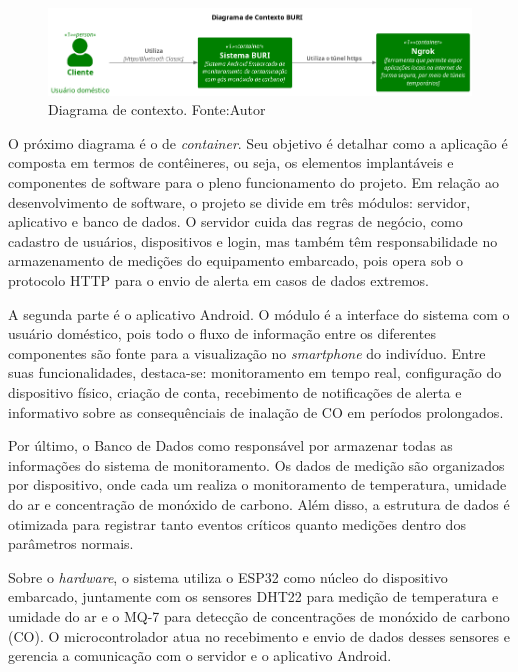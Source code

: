 \begin{figure}[ht]
    \centering
    \includegraphics[width=.87\textwidth]{img/context-diagram.png}
    \caption{Diagrama de contexto. Fonte:Autor}\label{figContextDiagram}
\end{figure}

O próximo diagrama é o de \textit{container}. Seu objetivo é detalhar como a aplicação é composta em termos de contêineres, ou seja, os elementos implantáveis e componentes de software 
para o pleno funcionamento do projeto. Em relação ao desenvolvimento de software, o projeto se divide em três módulos: servidor, aplicativo e banco de dados. O servidor cuida das regras
de negócio, como cadastro de usuários, dispositivos e login, mas também têm responsabilidade no armazenamento de medições do equipamento embarcado, pois opera sob o protocolo HTTP para o envio 
de alerta em casos de dados extremos.

A segunda parte é o aplicativo Android. O módulo é a interface do sistema com o usuário doméstico, pois todo o fluxo de informação entre os 
diferentes componentes são fonte para a visualização no \textit{smartphone} do indivíduo. Entre suas funcionalidades, destaca-se: monitoramento em tempo real, configuração do dispositivo físico, 
criação de conta, recebimento de notificações de alerta e informativo sobre as consequênciais de inalação de CO em períodos prolongados.

Por último, o Banco de Dados como responsável por armazenar todas as informações do sistema de monitoramento. Os dados de medição são organizados por dispositivo, onde 
cada um realiza o monitoramento de temperatura, umidade do ar e concentração de monóxido de carbono. Além disso, a estrutura de dados é otimizada para registrar tanto eventos críticos quanto 
medições dentro dos parâmetros normais.

Sobre o \textit{hardware}, o sistema utiliza o ESP32 como núcleo do dispositivo embarcado, juntamente com os sensores DHT22 para medição de temperatura e umidade do ar e o MQ-7 para 
detecção de concentrações de monóxido de carbono (CO). O microcontrolador atua no recebimento e envio de dados desses sensores e gerencia a comunicação com o servidor e o aplicativo Android. 

